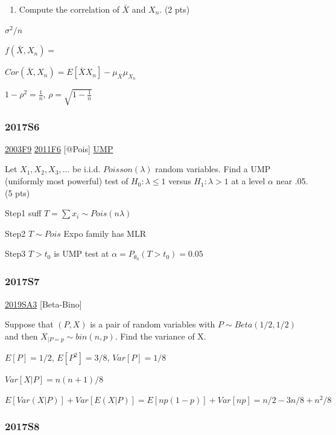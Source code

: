 \documentclass[10pt,twocolumn,portrait]{article}
\providecommand{\tightlist}{%
  \setlength{\itemsep}{0pt}\setlength{\parskip}{0pt}}
\begin{document}
\begin{enumerate}
\def\labelenumi{(\alph{enumi})}
\setcounter{enumi}{1}
\tightlist
\item
  Compute the correlation of \(\bar X\) and \(X_n\). (2 pts)
\end{enumerate}

\(\sigma^2/n\)

\(f(\bar X,X_n)=\)

\(Cor(\bar X,X_n)=E[\bar XX_n]-\mu_{\bar X}\mu_{X_n}\)

\(1-\rho^2=\frac1{n}\), \(\rho=\sqrt{1-\frac1{n}}\)

\hypertarget{s6-4}{%
\subsubsection{2017S6}\label{s6-4}}

\protect\hyperlink{f9-1}{2003F9} \protect\hyperlink{f6-4}{2011F6}
{[}@Pois{]} \protect\hyperlink{section-7}{UMP}

Let \(X_1,X_2,X_3,...\) be i.i.d. \(Poisson(\lambda)\) random variables.
Find a UMP (uniformly most powerful) test of \(H_0:\lambda\le1\) versus
\(H_1:\lambda>1\) at a level \(\alpha\) near .05. (5 pts)

Step1 suff \(T=\sum x_i\sim Pois(n\lambda)\)

Step2 \(T\sim Pois\) Expo family has MLR

Step3 \(T>t_0\) is UMP test at \(\alpha=P_{\theta_0}(T>t_0)=0.05\)

\hypertarget{s7-3}{%
\subsubsection{2017S7}\label{s7-3}}

\protect\hyperlink{sa3-3}{2019SA3} {[}Beta-Bino{]}

Suppose that \((P,X)\) is a pair of random variables with
\(P\sim Beta(1/2, 1/2)\) and then \(X_{|P=p}\sim bin(n,p)\). Find the
variance of X.

\(E[P]=1/2\), \(E[P^2]=3/8\), \(Var[P]=1/8\)

\(Var[X|P]=n(n+1)/8\)

\(E[Var(X|P)]+Var[E(X|P)]=E[np(1-p)]+Var[np]=n/2-3n/8+n^2/8\)

\hypertarget{s8-3}{%
\subsubsection{2017S8}\label{s8-3}}
\end{document}
